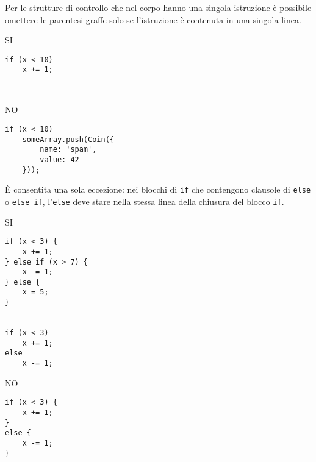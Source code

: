 \documentclass[../ProcessiPrimari.tex]{subfiles}
\begin{document}
Per le strutture di controllo che nel corpo hanno una singola istruzione è possibile omettere le parentesi graffe solo se l'istruzione è contenuta in una singola linea.
\begin{center}{
\begin{minipage}{6cm}
{\begin{center}SI\end{center}}
\begin{Verbatim}[frame=single]
if (x < 10)
    x += 1;



\end{Verbatim}
\end{minipage}
\hfil
\begin{minipage}{6cm}
{\begin{center}NO\end{center}}
\begin{Verbatim}[frame=single]
if (x < 10)
    someArray.push(Coin({
        name: 'spam',
        value: 42
    }));
\end{Verbatim}
\end{minipage}
}
\end{center}
\`{E} consentita una sola eccezione: nei blocchi di \texttt{if} che contengono clausole di \texttt{else} o \texttt{else if}, l'\texttt{else} deve stare nella stessa linea della chiusura del blocco \texttt{if}.
\begin{center}{
\begin{minipage}{6cm}
{\begin{center}SI\end{center}}
\begin{Verbatim}[frame=single]
if (x < 3) {
    x += 1;
} else if (x > 7) {
    x -= 1;
} else {
    x = 5;
}


if (x < 3)
    x += 1;
else
    x -= 1;
\end{Verbatim}
\end{minipage}
\hfil
\begin{minipage}{6cm}
{\begin{center}NO\end{center}}
\begin{Verbatim}[frame=single]
if (x < 3) {
    x += 1;
}
else {
    x -= 1;
}







\end{Verbatim}
\end{minipage}
}
\end{center}
\end{document}
